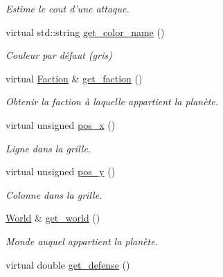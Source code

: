 \begin{DoxyCompactItemize}
\begin{DoxyCompactList}\small\item\em Estime le cout d'une attaque. \end{DoxyCompactList}\item 
\hypertarget{classVirtual__planet_a84cba41f0fa06d0512ea462a26b972e3}{virtual std\-::string \hyperlink{classVirtual__planet_a84cba41f0fa06d0512ea462a26b972e3}{get\-\_\-color\-\_\-name} ()}\label{classVirtual__planet_a84cba41f0fa06d0512ea462a26b972e3}

\begin{DoxyCompactList}\small\item\em Couleur par défaut (gris) \end{DoxyCompactList}\item 
virtual \hyperlink{classFaction}{Faction} \& \hyperlink{classVirtual__planet_ac0d0e30029566b9113652c04ec2e6599}{get\-\_\-faction} ()
\begin{DoxyCompactList}\small\item\em Obtenir la faction à laquelle appartient la planète. \end{DoxyCompactList}\item 
\hypertarget{classVirtual__planet_acccedbd81a89f4ad75a6a5c1c09b044c}{virtual unsigned \hyperlink{classVirtual__planet_acccedbd81a89f4ad75a6a5c1c09b044c}{pos\-\_\-x} ()}\label{classVirtual__planet_acccedbd81a89f4ad75a6a5c1c09b044c}

\begin{DoxyCompactList}\small\item\em Ligne dans la grille. \end{DoxyCompactList}\item 
\hypertarget{classVirtual__planet_a3453bf12cb4d348aee6594c127ba6a56}{virtual unsigned \hyperlink{classVirtual__planet_a3453bf12cb4d348aee6594c127ba6a56}{pos\-\_\-y} ()}\label{classVirtual__planet_a3453bf12cb4d348aee6594c127ba6a56}

\begin{DoxyCompactList}\small\item\em Colonne dans la grille. \end{DoxyCompactList}\item 
\hypertarget{classVirtual__planet_a1d3474a2ca3833a770c3763884a84323}{\hyperlink{classWorld}{World} \& \hyperlink{classVirtual__planet_a1d3474a2ca3833a770c3763884a84323}{get\-\_\-world} ()}\label{classVirtual__planet_a1d3474a2ca3833a770c3763884a84323}

\begin{DoxyCompactList}\small\item\em Monde auquel appartient la planète. \end{DoxyCompactList}\item 
\hypertarget{classVirtual__planet_a25045d61c5ee29b94de56db88fa96f98}{virtual double \hyperlink{classVirtual__planet_a25045d61c5ee29b94de56db88fa96f98}{get\-\_\-defense} ()}\label{classVirtual__planet_a25045d61c5ee29b94de56db88fa96f98}


\end{DoxyCompactItemize}
